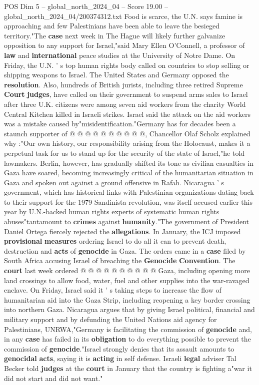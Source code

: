 \begin{textsample}{POS Dim 5 – global\_north\_2024\_04 – Score 19.00 – global\_north\_2024\_04/200374312.txt}
Food is scarce, the U.N. says famine is approaching and few Palestinians have been able to leave the besieged territory."The \textbf{case} next week in The Hague will likely further galvanize opposition to any support for Israel,"said Mary Ellen O'Connell, a professor of \textbf{law} and \textbf{international} peace studies at the University of Notre Dame.
On Friday, the U.N. ' s top human rights body called on countries to stop selling or shipping weapons to Israel.
The United States and Germany opposed the \textbf{resolution}.
Also, hundreds of British jurists, including three retired Supreme \textbf{Court} \textbf{judges}, have called on their government to suspend arms sales to Israel after three U.K. citizens were among seven aid workers from the charity World Central Kitchen killed in Israeli strikes.
Israel said the attack on the aid workers was a mistake caused by"misidentification."Germany has for decades been a staunch supporter of @ @ @ @ @ @ @ @ @ @, Chancellor Olaf Scholz explained why :"Our own history, our responsibility arising from the Holocaust, makes it a perpetual task for us to stand up for the security of the state of Israel,"he told lawmakers.
Berlin, however, has gradually shifted its tone as civilian casualties in Gaza have soared, becoming increasingly critical of the humanitarian situation in Gaza and spoken out against a ground offensive in Rafah.
Nicaragua ' s government, which has historical links with Palestinian organizations dating back to their support for the 1979 Sandinista revolution, was itself accused earlier this year by U.N.-backed human rights experts of systematic human rights abuses"tantamount to \textbf{crimes} against \textbf{humanity}."The government of President Daniel Ortega fiercely rejected the \textbf{allegations}.
In January, the ICJ imposed \textbf{provisional} \textbf{measures} ordering Israel to do all it can to prevent death, destruction and \textbf{acts} of \textbf{genocide} in Gaza.
The orders came in a \textbf{case} filed by South Africa accusing Israel of breaching the \textbf{Genocide} \textbf{Convention}.
The \textbf{court} last week ordered @ @ @ @ @ @ @ @ @ @ Gaza, including opening more land crossings to allow food, water, fuel and other supplies into the war-ravaged enclave.
On Friday, Israel said it ' s taking steps to increase the flow of humanitarian aid into the Gaza Strip, including reopening a key border crossing into northern Gaza.
Nicaragua argues that by giving Israel political, financial and military support and by defunding the United Nations aid agency for Palestinians, UNRWA,"Germany is facilitating the commission of \textbf{genocide} and, in any \textbf{case} has failed in its \textbf{obligation} to do everything possible to prevent the commission of \textbf{genocide}."Israel strongly denies that its assault amounts to \textbf{genocidal} \textbf{acts}, saying it is \textbf{acting} in self defense.
Israeli \textbf{legal} adviser Tal Becker told \textbf{judges} at the \textbf{court} in January that the country is fighting a"war it did not start and did not want."


\end{textsample}
